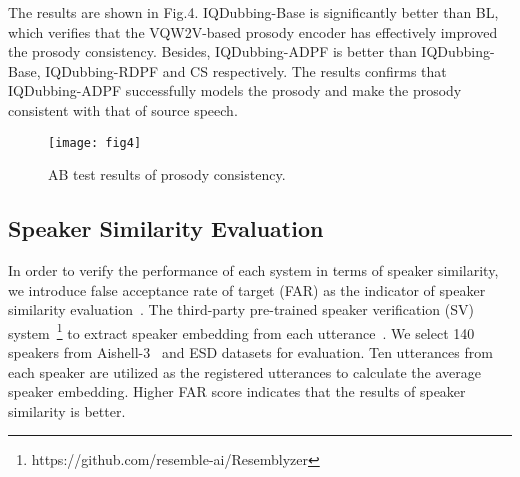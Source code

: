 \documentclass{article}
\begin{document}
The results are shown in Fig.4. IQDubbing-Base is significantly better than BL, which verifies that the VQW2V-based prosody encoder has effectively improved the prosody consistency. Besides, IQDubbing-ADPF is better than IQDubbing-Base, IQDubbing-RDPF and CS respectively. The results confirms that IQDubbing-ADPF successfully models the prosody and make the prosody consistent with that of source speech. 

\begin{figure}[!h]
  \centering
  \centerline{\texttt{[image: fig4]}}
\label{fig:res}
\caption{AB test results of prosody consistency.}
\end{figure}


\subsection{Speaker Similarity Evaluation}
\label{ssec:subhead}
In order to verify the performance of each system in terms of speaker similarity, we introduce false acceptance rate of target (FAR) as the indicator of speaker similarity evaluation~\cite{das2020predictions}. The third-party pre-trained speaker verification (SV) system~\footnote{https://github.com/resemble-ai/Resemblyzer} to extract speaker embedding from each utterance~\cite{wan2018generalized}.  We select 140 speakers from Aishell-3~\cite{shi2020aishell} and ESD datasets for evaluation. Ten utterances from each speaker are utilized as the registered utterances to calculate the average speaker embedding.  Higher FAR score indicates that the results of speaker similarity is better.


\end{document}
